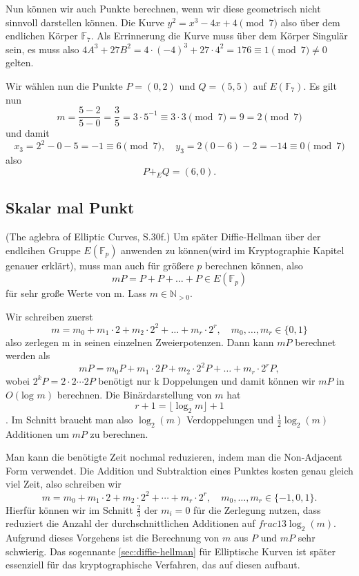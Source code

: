 \begin{beispiel}
    Nun können wir auch Punkte berechnen, wenn wir diese geometrisch nicht sinnvoll darstellen können. Die Kurve \(y^2=x^3-4x+4\pmod 7\) also über dem endlichen Körper $\mathbb{F}_7$. Als Errinnerung die Kurve muss über dem Körper Singulär sein, es muss also \(4A^3+27B^2=4\cdot(-4)^3+27\cdot4^2=176\equiv1\pmod 7\neq0\) gelten.

    Wir wählen nun die Punkte $P=(0,2)$ und \(Q=(5,5)\)
    auf $E(\mathbb{F}_7)$.
    Es gilt nun
    \[
        m=\frac{5-2}{5-0}=\frac{3}{5} = 3\cdot 5^{-1}\equiv 3\cdot 3 \pmod 7= 9 = 2 \pmod 7
    \]
    und damit
    \[
        x_3=2^2-0-5=-1\equiv 6 \pmod 7, \quad y_3=2(0-6)-2=-14 \equiv 0\pmod 7
    \]
    also
    \[P+_EQ=(6,0).\]
\end{beispiel}

\subsection*{Skalar mal Punkt}(The aglebra of Elliptic Curves, S.30f.)
Um später Diffie-Hellman über der endlcihen Gruppe $E(\mathbb{F}_p)$ anwenden zu können(wird im Kryptographie Kapitel genauer erklärt), muss man auch für größere $p$ berechnen können, also
\[mP=P+P+\dots+P\in E(\mathbb{F}_p)\] für sehr große Werte von m.
Lass \(m\in\mathbb{N}_{>0}\).

Wir schreiben zuerst
\[m=m_0+m_1\cdot2+m_2\cdot 2^2+\dots+m_r\cdot 2^r, \quad m_0,\dots,m_r\in\{0,1\}\]
also zerlegen m in seinen einzelnen Zweierpotenzen. Dann kann $mP$ berechnet werden als
\[mP=m_0P+m_1\cdot 2P+m_2\cdot2^2P+\dots +m_r\cdot 2^rP,\]
wobei \(2^kP=2\cdot 2\cdots 2P\) benötigt nur k Doppelungen und damit können wir $mP$ in $O(\text{log } m)$ berechnen. Die Binärdarstellung von $m$ hat
\[
    r+1 = \lfloor\log_2m \rfloor+1
\].
Im Schnitt braucht man also $\log_2(m)$ Verdoppelungen und \(\frac{1}{2}\log_2(m)\) Additionen um $mP$ zu berechnen.

Man kann die benötigte Zeit nochmal reduzieren, indem man die Non-Adjacent Form verwendet. Die Addition und Subtraktion eines Punktes kosten genau gleich viel Zeit, also schreiben wir
\[
    m=m_0+m_1\cdot 2+m_2\cdot 2^2+\cdots+m_r\cdot 2^r, \quad m_0,\dots,m_r\in\{-1,0,1\}.
\]
Hierfür können wir im Schnitt  $\frac{2}{3}$ der $m_i=0$ für die Zerlegung nutzen, dass reduziert die Anzahl der durchschnittlichen Additionen auf \(frac{1}{3}\log_2(m)
\).
Aufgrund dieses Vorgehens ist die Berechnung von $m$ aus $P$ und $mP$ sehr schwierig. Das sogennante \ref{sec:diffie-hellman} für Elliptische Kurven ist später essenziell für das kryptographische Verfahren, das auf diesen aufbaut.


